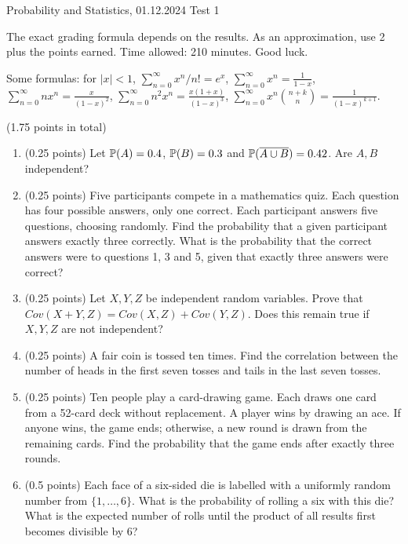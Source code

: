 \documentclass[a4paper]{report}
\begin{document}
\noindent Probability and Statistics, 01.12.2024 \hfill Test 1

\hrulefill

\begin{it}
The exact grading formula depends on the results. As an approximation, use 2 plus the points earned. Time allowed: 210 minutes. Good luck.

Some formulas: for $|x|<1$,
$\sum_{n=0}^\infty  x^n/n! = e^x$,
$\sum_{n=0}^\infty x^n = \frac{1}{1-x}$,
$\sum_{n=0}^\infty nx^n = \frac{x}{(1-x)^2}$,
$\sum_{n=0}^\infty n^2x^n = \frac{x(1+x)}{(1-x)^3}$,
$\sum_{n=0}^\infty x^n \binom{n+k}{n} = \frac{1}{(1-x) ^{k+1}}$.



\end{it}

\begin{problem} (1.75 points in total)
    \begin{enumerate}

    \item (0.25 points) Let \(\P(A)=0.4\), \(\P(B)=0.3\) and \(\P(\overline{A\cup B})=0.42\). Are \(A,B\) independent?
        \item (0.25 points) Five participants compete in a mathematics quiz. Each question has four possible answers, only one correct. Each participant answers five questions, choosing randomly. Find the probability that a given participant answers exactly three correctly.
        What is the probability that the correct answers were to questions 1, 3 and 5,
        given that exactly three answers were correct?


        \item (0.25 points) Let $X,Y,Z$
        be independent random variables. Prove that
        $Cov(X+Y,Z) = Cov(X,Z) + Cov(Y,Z)$.
        Does this remain true if $X,Y,Z$ are not
        independent?

\item (0.25 points) A fair coin is tossed ten times. Find the correlation between the number of heads in the first seven tosses and tails in the last seven tosses.

        \item (0.25 points) Ten people play a card-drawing game. Each draws one card from a 52-card deck without replacement. A player wins by drawing an ace. If anyone wins, the game ends; otherwise, a new round is drawn from the remaining cards. Find the probability that the game ends after exactly three rounds.

    \item (0.5 points)
Each face of a six-sided die is labelled with a uniformly
random number from $\{1,\dots,6\}$.
What is the probability
of rolling a six
with this die?
What is the expected number of rolls until the product of all results first becomes divisible by 6?
    \end{enumerate}

\end{problem}
\end{document}
